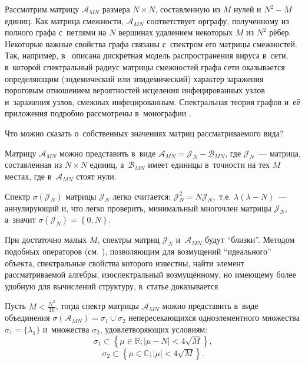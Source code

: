 Рассмотрим матрицу \( \mathscr{A}_{MN} \) размера \( N\times N \),
 составленную из \( M \) нулей и \( N^2 - M \) единиц.
Как матрица смежности, \( \mathscr{A}_{MN} \) соответствует орграфу,
 полученному из полного графа с~петлями на \( N \) вершинах
 удалением некоторых \( M \) из \( N^2 \) р\"ебер.
Некоторые важные свойства графа связаны с~спектром его матрицы смежностей.
Так, например, в~\cite{epidemic} описана дискретная модель
 распространения вируса в~сети, в~которой спектральный радиус матрицы смежностей графа сети
 оказывается определяющим (эндемический или эпидемический) характер заражения
 пороговым отношением вероятностей исцеления инфецированных узлов
 и~заражения узлов, смежных инфецированным.
Спектральная теория графов и~е\"е приложения подробно рассмотрены
в~монографии \cite{cvet}.

Что можно сказать о~собственных значениях матриц рассматриваемого вида?

Матрицу \( \mathscr{A}_{MN} \) можно представить в~виде
 \( \mathscr{A}_{MN} = \mathcal{J}_N - \mathscr{B}_{MN} \),
 где \( \mathcal{J}_N \)~--- матрица, составленная из \( N\times N \) единиц,
 а~\( \mathscr{B}_{MN} \) имеет единицы в~точности на тех \( M \) местах,
 где в~\( \mathscr{A}_{MN} \) стоят нули.

Спектр \( \sigma\left( \mathcal{J}_N \right) \)
 матрицы \( \mathcal{J}_N \) легко считается:
 \( \mathcal{J}_N^2 = N \mathcal{J}_N, \) т.е.
 \( \lambda(\lambda - N) \)~--- аннулирующий и, что легко проверить,
 минимальный многочлен матрицы \( \mathcal{J}_N \), а~значит
 \( \sigma\left( \mathcal{J}_N \right) = \left\{ 0,N \right\}. \)

При достаточно малых \( M \),
 спектры матриц \( \mathcal{J}_N \) и~\( \mathscr{A}_{MN} \) будут ``близки''.
Методом подобных операторов (см. \cite{baskakov-harmonic,baskakov-split}),
 позволяющим для возмущений ``идеального'' объекта, спектральные свойства которого известны,
 найти элемент рассматриваемой алгебры, изоспектральный возмущ\"енному,
 но имеющему более удобную для вычислений структуру,
 в~статье доказывается
\begin{thm}\label{kozlukovsv:thm:almost-all-ones}
    Пусть \( M < \frac{N^2}{16} \),
    тогда спектр матрицы \( \mathscr{A}_{MN} \) можно представить в~виде
    объединения \( \sigma\left(\mathscr{A}_{MN}\right) = \sigma_1 \cup \sigma_2 \)
    непересекающихся
    одноэлементного множества \( \sigma_1=\{\lambda_1\} \)
    и~множества \( \sigma_2 \), удовлетворяющих условиям:
    \[ \sigma_1 \subset \left\{ \mu\in\mathbb{R}; \lvert \mu - N \rvert < 4\sqrt{M} \right\}, \]
    \[ \sigma_2 \subset \left\{ \mu\in\mathbb{C}; \lvert \mu \rvert < 4\sqrt{M} \right\}. \]
\end{thm}
